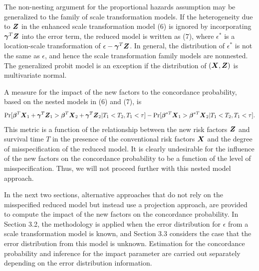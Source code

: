 \documentclass[12pt]{article}
\newcommand{\bmX}{\mbox{\boldmath $X$}}
\newcommand{\bg}{\mbox{\boldmath $\gamma$}}
\newcommand{\bb}{\mbox{\boldmath $\beta$}}
\newcommand{\bmZ}{\mbox{\boldmath $Z$}}
\begin{document}
The non-nesting argument for the proportional hazards assumption may be generalized to the family of scale transformation models.  If the heterogeneity due to $\bmZ$ in the enhanced scale transformation model (6)
is ignored by incorporating $\bg^T \bmZ$ into the error term, the reduced model is written as (7),
where $\epsilon^*$ is a location-scale transformation of $\epsilon - \bg^T \bmZ$. In general, the distribution of $\epsilon^*$ is not the same as $\epsilon$, and hence the scale transformation family models are nonnested. The generalized probit model is an exception if the distribution of $(\bmX, \bmZ)$ is multivariate normal.

A measure for the impact of the new factors to the concordance probability, based on the nested models in (6) and (7),  is 
\small 
\[  \mbox{Pr}[\bb^{T}\bmX_1 + \bg^T \bmZ_1 >  \bb^{T}\bmX_2 + \bg^T \bmZ_2  | T_1 < T_2, T_1 < \tau] - \mbox{Pr}[\bb^{* T}\bmX_1  >  \bb^{* T}\bmX_2  | T_1 < T_2, T_1 < \tau] .\]
\normalsize
This metric is a function of the relationship between the new risk factors $\bmZ$ and survival time $T$ in the presence of the conventional risk factors $\bmX$ and the degree of misspecification of the reduced model.  It is clearly undesirable for the influence of the new factors on the concordance probability to be a function of the level of misspecification. Thus, we will not proceed further with this nested model approach.

In the next two sections, alternative approaches that do not rely on the misspecified reduced model but instead use a projection approach, are provided to compute the impact of the new factors on the concordance probability. In Section 3.2, the methodology is applied when the error distribution for $\epsilon$ from a scale transformation model is known, and Section 3.3 considers the case that the error distribution from this model is unknown. Estimation for the concordance probability and inference for the impact parameter are carried out separately depending on the error distribution information.  

\vskip 0.20in

\end{document}
